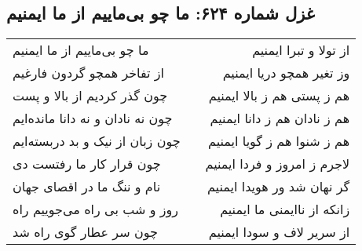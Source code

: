 \begin{center}
\section*{غزل شماره ۶۲۴: ما چو بی‌ماییم از ما ایمنیم}
\label{sec:624}
\begin{longtable}{l p{0.5cm} r}
ما چو بی‌ماییم از ما ایمنیم
&&
از تولا و تبرا ایمنیم
\\
از تفاخر همچو گردون فارغیم
&&
وز تغیر همچو دریا ایمنیم
\\
چون گذر کردیم از بالا و پست
&&
هم ز پستی هم ز بالا ایمنیم
\\
چون نه نادان و نه دانا مانده‌ایم
&&
هم ز نادان هم ز دانا ایمنیم
\\
چون زبان از نیک و بد دربسته‌ایم
&&
هم ز شنوا هم ز گویا ایمنیم
\\
چون قرار کار ما رفتست دی
&&
لاجرم ز امروز و فردا ایمنیم
\\
نام و ننگ ما در اقصای جهان
&&
گر نهان شد ور هویدا ایمنیم
\\
روز و شب بی راه می‌جوییم راه
&&
زانکه از ناایمنی ما ایمنیم
\\
چون سر عطار گوی راه شد
&&
از سریر لاف و سودا ایمنیم
\\
\end{longtable}
\end{center}
